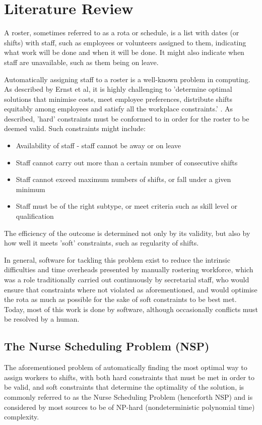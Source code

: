 \chapter{Literature Review}
A roster, sometimes referred to as a rota or schedule, is a list with dates (or shifts) with staff, such as employees or volunteers assigned to them, indicating what work will be done and when it will be done. It might also indicate when staff are unavailable, such as them being on leave. \cite{CollinsRoster}

Automatically assigning staff to a roster is a well-known problem in computing. As described by Ernst et al, it is highly challenging to 'determine optimal solutions that minimise costs, meet employee preferences, distribute shifts equitably among employees and satisfy all the workplace constraints.' \cite{ERNST20043}. As described, 'hard' constraints must be conformed to in order for the roster to be deemed valid. Such constraints might include: \cite{Chen2016}

\begin{itemize}
    \item Availability of staff - staff cannot be away or on leave
    \item Staff cannot carry out more than a certain number of consecutive shifts
    \item Staff cannot exceed maximum numbers of shifts, or fall under a given minimum
    \item Staff must be of the right subtype, or meet criteria such as skill level or qualification
\end{itemize}

The efficiency of the outcome is determined not only by its validity, but also by how well it meets 'soft' constraints, such as regularity of shifts.

In general, software for tackling this problem exist to reduce the intrinsic difficulties and time overheads presented by manually rostering workforce, which was a role traditionally carried out continuously by secretarial staff, who would ensure that constraints where not violated as aforementioned, and would optimise the rota as much as possible for the sake of soft constraints to be best met. Today, most of this work is done by software, although occasionally conflicts must be resolved by a human. \cite{Maes1994AgentsTR}

\section{The Nurse Scheduling Problem (NSP)}
The aforementioned problem of automatically finding the most optimal way to assign workers to shifts, with both hard constraints that must be met in order to be valid, and soft constraints that determine the optimality of the solution, is commonly referred to as the Nurse Scheduling Problem (henceforth NSP) and is considered by most sources to be of NP-hard (nondeterministic polynomial time) complexity. \cite{Tassopoulos2013} 

